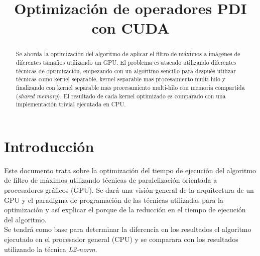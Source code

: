 \documentclass[conference]{IEEEtran}
\begin{document}
\title{Optimización de operadores PDI con CUDA}

\author{
}


\maketitle
\thispagestyle{plain}
\pagestyle{plain}

\begin{abstract}
Se aborda la optimización del algoritmo de aplicar el filtro de máximos a imágenes de diferentes tamaños utilizando un GPU. El problema es atacado utilizando diferentes técnicas de optimización, empezando con un algoritmo sencillo para después utilizar técnicas como kernel separable, kernel separable mas procesamiento multi-hilo y finalizando con kernel separable mas procesamiento multi-hilo con memoria compartida (\textit{shared memory}). El resultado de cada kernel optimizado es comparado con una implementación trivial ejecutada en CPU.

\end{abstract}


\section{\textbf{Introducción}}
Este documento trata sobre la optimización del tiempo de ejecución del  algoritmo de filtro de máximos utilizando técnicas de paralelización orientada a procesadores gráficos (GPU). Se dará una visión general de la arquitectura de un GPU y el paradigma de programación de las técnicas utilizadas para la optimización y así explicar el porque de la reducción en el tiempo de ejecución del algoritmo.\\
Se tendrá como base para determinar la diferencia en los resultados el algoritmo ejecutado en el procesador general (CPU) y se comparara con los resultados utilizando la técnica \textit{L2-norm}.
\end{document}
